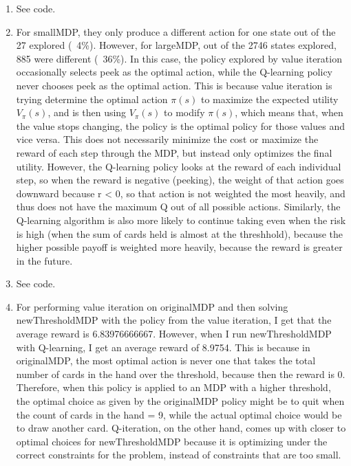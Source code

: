 \documentclass[12pt]{article}
\begin{document}
\begin{enumerate}[label=(\alph*)]
  \item See code.
  \item For smallMDP, they only produce a different action for one state out of the 27 explored (~4\%). However, for largeMDP, out of the 2746 states explored, 885 were different (~36\%). In this case, the policy explored by value iteration occasionally selects peek as the optimal action, while the Q-learning policy never chooses peek as the optimal action. This is because value iteration is trying determine the optimal action $\pi(s)$ to maximize the expected utility $V_\pi(s)$, and is then using $V_\pi(s)$ to modify $\pi(s)$, which means that, when the value stops changing, the policy is the optimal policy for those values and vice versa. This does not necessarily minimize the cost or maximize the reward of each step through the MDP, but instead only optimizes the final utility. However, the Q-learning policy looks at the reward of each individual step, so when the reward is negative (peeking), the weight of that action goes downward because r < 0, so that action is not weighted the most heavily, and thus does not have the maximum Q out of all possible actions. Similarly, the Q-learning algorithm is also more likely to continue taking even when the risk is high (when the sum of cards held is almost at the threshhold), because the higher possible payoff is weighted more heavily, because the reward is greater in the future.
  \item See code.
  \item For performing value iteration on originalMDP and then solving newThresholdMDP with the policy from the value iteration, I get that the average reward is 6.83976666667. However, when I run newThresholdMDP with Q-learning, I get an average reward of 8.9754. This is because in originalMDP, the most optimal action is never one that takes the total number of cards in the hand over the threshold, because then the reward is 0. Therefore, when this policy is applied to an MDP with a higher threshold, the optimal choice as given by the originalMDP policy might be to quit when the count of cards in the hand = 9, while the actual optimal choice would be to draw another card. Q-iteration, on the other hand, comes up with closer to optimal choices for newThresholdMDP because it is optimizing under the correct constraints for the problem, instead of constraints that are too small. 
\end{enumerate}
\end{document}
